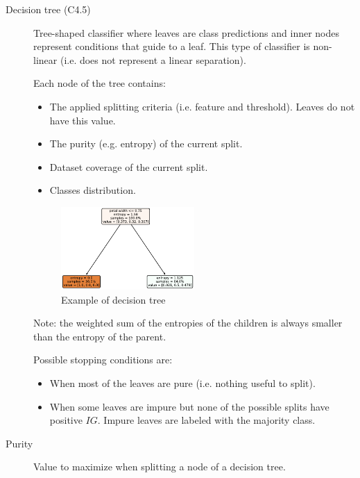 \begin{description}
    \item[Decision tree (C4.5)] 
        Tree-shaped classifier where leaves are class predictions and 
        inner nodes represent conditions that guide to a leaf.
        This type of classifier is non-linear (i.e. does not represent a linear separation).

        Each node of the tree contains:
        \begin{itemize}
            \item The applied splitting criteria (i.e. feature and threshold). 
                Leaves do not have this value.
            \item The purity (e.g. entropy) of the current split.
            \item Dataset coverage of the current split.
            \item Classes distribution.
        \end{itemize}

        \begin{figure}[H]
            \centering
            \includegraphics[width=0.5\textwidth]{img/_iris_decision_tree_example.pdf}
            \caption{Example of decision tree}
        \end{figure}

        Note: the weighted sum of the entropies of the children is always smaller than the entropy of the parent.

        Possible stopping conditions are:
        \begin{itemize}
            \item When most of the leaves are pure (i.e. nothing useful to split).
            \item When some leaves are impure but none of the possible splits have positive $IG$.
                Impure leaves are labeled with the majority class.
        \end{itemize}

    \item[Purity] 
        Value to maximize when splitting a node of a decision tree.


\end{description}
